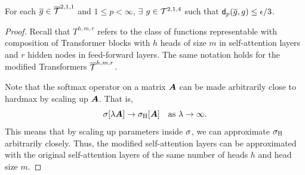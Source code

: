\begin{lemma}
\label{lemma:part3}
For each $\overline g \in \overline {\mathcal{T}}^{2,1,1}$ and $1 \leq p < \infty$, $\exists$ $g \in \mathcal{T}^{2,1,4}$ such that $\mathsf{d}_p(\overline g,g) \leq \epsilon/3$.
\end{lemma}

\begin{proof}
Recall that $T^{h,m,r}$ refers to the class of functions representable with composition of Transformer blocks with $h$ heads of size $m$ in self-attention layers and $r$ hidden nodes in feed-forward layers. The same notation holds for the modified Transformers $\overline {\mathcal{T}}^{h,m,r}$.

Note that the softmax operator on a matrix ${\bm{A}}$ can be made arbitrarily close to hardmax by scaling up ${\bm{A}}$. That is,
\begin{equation*}
    \sigma[\lambda {\bm{A}}] \rightarrow \sigma_{\rm H}[{\bm{A}}] ~~ \text{ as } \lambda \rightarrow \infty.
\end{equation*}
This means that by scaling up parameters inside $\sigma$, we can approximate $\sigma_{\rm H}$ arbitrarily closely. Thus, the modified self-attention layers can be approximated with the original self-attention layers of the same number of heads $h$ and head size $m$.


\end{proof}
